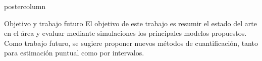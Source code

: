 \documentclass{beamer}
\begin{document}
\begin{frame}
\begin{columns}
\begin{column}{.57\textwidth}
\begin{beamercolorbox}[center]{postercolumn}
\begin{minipage}{.98\textwidth}
{					\begin{myblock}{Objetivo y trabajo futuro}
						El objetivo de este trabajo es resumir el estado del arte en el área y
						evaluar mediante simulaciones los principales modelos propuestos. Como trabajo futuro,
						se sugiere proponer nuevos métodos de cuantificación, tanto para estimación puntual
						como por intervalos.
					\end{myblock}\vfill

		}\end{minipage}\end{beamercolorbox}
	\end{column}
\end{columns}
\end{frame}
\end{document}
